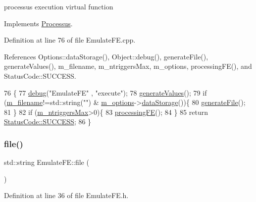 processus execution virtual function 

Implements \hyperlink{classProcessus_a63767a63a1fb0055c5aa45b21a4a5d58}{Processus}.



Definition at line 76 of file Emulate\+F\+E.\+cpp.



References Options\+::data\+Storage(), Object\+::debug(), generate\+File(), generate\+Values(), m\+\_\+filename, m\+\_\+ntriggers\+Max, m\+\_\+options, processing\+F\+E(), and Status\+Code\+::\+S\+U\+C\+C\+E\+SS.


\begin{DoxyCode}
76                                 \{
77   \hyperlink{classObject_aac010553f022165573714b7014a15f0d}{debug}(\textcolor{stringliteral}{"EmulateFE"} , \textcolor{stringliteral}{"execute"});
78   \hyperlink{classEmulateFE_ae557d3569b9285a871c502b93ba20494}{generateValues}();
79   \textcolor{keywordflow}{if} (\hyperlink{classEmulateFE_a103fedea9eb5d3963573f9120cb81a68}{m\_filename}!=std::string(\textcolor{stringliteral}{""}) & \hyperlink{classEmulateFE_a2f2da7d4b2164c47673a6ecc6dcef1ea}{m\_options}->\hyperlink{classOptions_aed7799d10139fa542055b982cb820192}{dataStorage}())\{
80     \hyperlink{classEmulateFE_ae62bc56b44c4bcdf7f5eab5cbde2cd69}{generateFile}();
81   \}
82   \textcolor{keywordflow}{if} (\hyperlink{classEmulateFE_a2d473d12faf30f4870458874d70c7f55}{m\_ntriggersMax}>0)\{
83     \hyperlink{classEmulateFE_adf7213a308c8a04f4d7efbb86a13689e}{processingFE}();
84   \}
85   \textcolor{keywordflow}{return} \hyperlink{classStatusCode_a6f565cbeadc76d14c72f047e5e85eb4badd0da38d3ba0d922efd1f4619bc37ad8}{StatusCode::SUCCESS};
86 \}
\end{DoxyCode}
\mbox{\label{classEmulateFE_a321a82d6ead6f6089693d3165d7893ec}} 
\subsubsection{\texorpdfstring{file()}{file()}}
{\footnotesize\ttfamily std\+::string Emulate\+F\+E\+::file (\begin{DoxyParamCaption}{ }\end{DoxyParamCaption})\hspace{0.3cm}{\ttfamily [inline]}}



Definition at line 36 of file Emulate\+F\+E.\+h.



